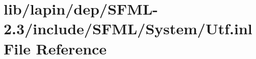 \hypertarget{lapin_2dep_2_s_f_m_l-2_83_2include_2_s_f_m_l_2_system_2_utf_8inl}{\section{lib/lapin/dep/\-S\-F\-M\-L-\/2.3/include/\-S\-F\-M\-L/\-System/\-Utf.inl File Reference}
\label{lapin_2dep_2_s_f_m_l-2_83_2include_2_s_f_m_l_2_system_2_utf_8inl}
}
